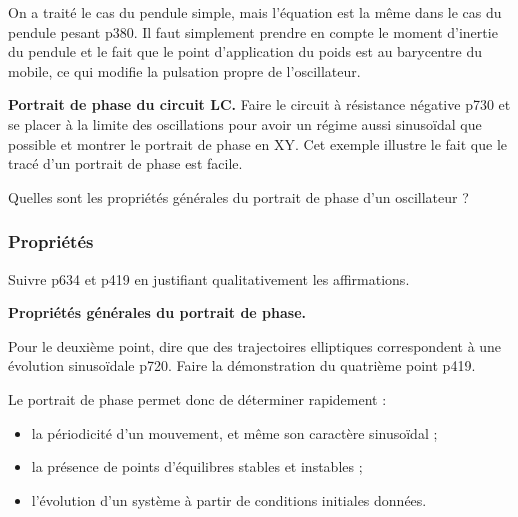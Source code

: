 \begin{remarque}
On a traité le cas du pendule simple, mais l'équation est la même dans le cas du pendule pesant \cite{Bocquet2002} p380.
Il faut simplement prendre en compte le moment d'inertie du pendule et le fait que le point d'application du poids est au barycentre du mobile, ce qui modifie la pulsation propre de l'oscillateur.
\end{remarque}

\begin{experience}
\textbf{Portrait de phase du circuit LC.}
Faire le circuit à résistance négative \cite{Gie1992} p730 et se placer à la limite des oscillations pour avoir un régime aussi sinusoïdal que possible et montrer le portrait de phase en XY.
Cet exemple illustre le fait que le tracé d'un portrait de phase est facile.
\end{experience}

\begin{transition}
Quelles sont les propriétés générales du portrait de phase d'un oscillateur ?
\end{transition}

\subsubsection{Propriétés}

Suivre \cite{Salamito2016} p634 et \cite{Bocquet2002} p419 en justifiant qualitativement les affirmations.
\begin{slide}
\textbf{Propriétés générales du portrait de phase.}
\end{slide}
Pour le deuxième point, dire que des trajectoires elliptiques correspondent à une évolution sinusoïdale \cite{Gie1992} p720.
Faire la démonstration du quatrième point \cite{Bocquet2002} p419.

Le portrait de phase permet donc de déterminer rapidement :
\begin{itemize}
\item la périodicité d'un mouvement, et même son caractère sinusoïdal ;
\item la présence de points d'équilibres stables et instables ;
\item l'évolution d'un système à partir de conditions initiales données.
\end{itemize}

